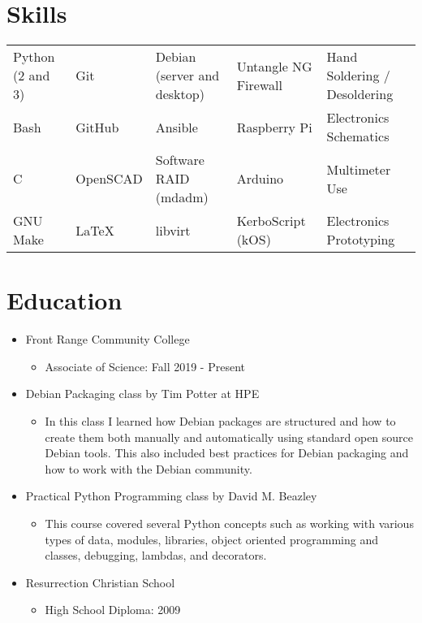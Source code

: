 \documentclass[letterpaper,10pt]{article}
\begin{document}

    \newpage

    \section*{Skills}
        \begin{tabular}{lllll}
            Python (2 and 3) & Git      & Debian (server and desktop) & Untangle NG Firewall & Hand Soldering / Desoldering \\
            Bash             & GitHub   & Ansible                     & Raspberry Pi         & Electronics Schematics \\
            C                & OpenSCAD & Software RAID (mdadm)       & Arduino              & Multimeter Use \\
            GNU Make         & \LaTeX   & libvirt                     & KerboScript (kOS)    & Electronics Prototyping \\
        \end{tabular}

    \section*{Education}
        \begin{itemize}
            \item Front Range Community College
            \begin{itemize}
                \item Associate of Science: Fall 2019 - Present
            \end{itemize}
            \item Debian Packaging class by Tim Potter at HPE
            \begin{itemize}
                \item In this class I learned how Debian packages are structured and how to create them both manually and automatically using standard open source Debian tools. This also included best practices for Debian packaging and how to work with the Debian community.
            \end{itemize}
            \item Practical Python Programming class by David M. Beazley
            \begin{itemize}
                \item This course covered several Python concepts such as working with various types of data, modules, libraries, object oriented programming and classes, debugging, lambdas, and decorators.
            \end{itemize}
            \item Resurrection Christian School
            \begin{itemize}
                \item High School Diploma: 2009
            \end{itemize}
        \end{itemize}
\end{document}
